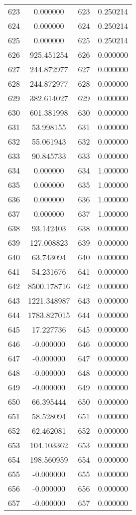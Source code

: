 \documentclass[12pt]{article}
\begin{document}
\begin{longtable}{@{}cccc@{}}
623 & 0.000000 & 623 & 0.250214 \\
624 & 0.000000 & 624 & 0.250214 \\
625 & 0.000000 & 625 & 0.250214 \\
626 & 925.451254 & 626 & 0.000000 \\
627 & 244.872977 & 627 & 0.000000 \\
628 & 244.872977 & 628 & 0.000000 \\
629 & 382.614027 & 629 & 0.000000 \\
630 & 601.381998 & 630 & 0.000000 \\
631 & 53.998155 & 631 & 0.000000 \\
632 & 55.061943 & 632 & 0.000000 \\
633 & 90.845733 & 633 & 0.000000 \\
634 & 0.000000 & 634 & 1.000000 \\
635 & 0.000000 & 635 & 1.000000 \\
636 & 0.000000 & 636 & 1.000000 \\
637 & 0.000000 & 637 & 1.000000 \\
638 & 93.142403 & 638 & 0.000000 \\
639 & 127.008823 & 639 & 0.000000 \\
640 & 63.743094 & 640 & 0.000000 \\
641 & 54.231676 & 641 & 0.000000 \\
642 & 8500.178716 & 642 & 0.000000 \\
643 & 1221.348987 & 643 & 0.000000 \\
644 & 1783.827015 & 644 & 0.000000 \\
645 & 17.227736 & 645 & 0.000000 \\
646 & -0.000000 & 646 & 0.000000 \\
647 & -0.000000 & 647 & 0.000000 \\
648 & -0.000000 & 648 & 0.000000 \\
649 & -0.000000 & 649 & 0.000000 \\
650 & 66.395444 & 650 & 0.000000 \\
651 & 58.528094 & 651 & 0.000000 \\
652 & 62.462081 & 652 & 0.000000 \\
653 & 104.103362 & 653 & 0.000000 \\
654 & 198.560959 & 654 & 0.000000 \\
655 & -0.000000 & 655 & 0.000000 \\
656 & -0.000000 & 656 & 0.000000 \\
657 & -0.000000 & 657 & 0.000000 \\

\end{longtable}
\end{document}
